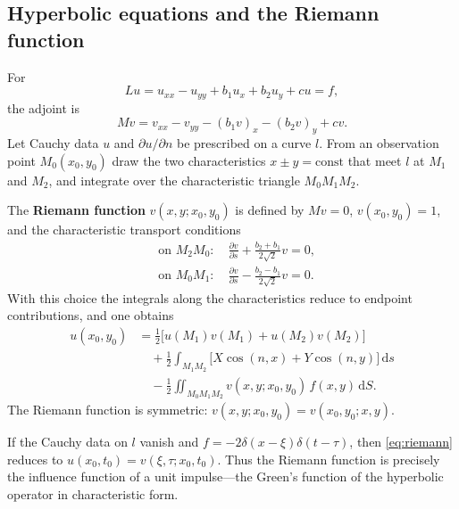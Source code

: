 \subsection{Hyperbolic equations and the Riemann function}

For
\begin{equation}
Lu=u_{xx}-u_{yy}+b_1 u_x+b_2 u_y+cu=f,
\end{equation}
the adjoint is
\begin{equation}
Mv=v_{xx}-v_{yy}-(b_1 v)_x-(b_2 v)_y+cv.
\end{equation}
Let Cauchy data $u$ and $\partial u/\partial n$ be prescribed on a curve $l$. From an observation point $M_0(x_0,y_0)$ draw the two characteristics $x\pm y=\mathrm{const}$ that meet $l$ at $M_1$ and $M_2$, and integrate over the characteristic triangle $M_0M_1M_2$.

The \textbf{Riemann function} $v(x,y;x_0,y_0)$ is defined by $Mv=0$, $v(x_0,y_0)=1$, and the characteristic transport conditions
\begin{equation}
\begin{aligned}
&\text{on }M_2M_0:\quad
\frac{\partial v}{\partial s}+\frac{b_2+b_1}{2\sqrt{2}}v=0,\\
&\text{on }M_0M_1:\quad
\frac{\partial v}{\partial s}-\frac{b_2-b_1}{2\sqrt{2}}v=0.
\end{aligned}
\end{equation}
With this choice the integrals along the characteristics reduce to endpoint contributions, and one obtains
\begin{equation}
\label{eq:riemann}
\begin{aligned}
u(x_0,y_0)
&=\frac12\bigl[u(M_1)v(M_1)+u(M_2)v(M_2)\bigr]\\
&\quad+\frac12\int_{M_1M_2}\bigl[X\cos(n,x)+Y\cos(n,y)\bigr]\,\mathrm{d}s\\
&\quad-\frac12\iint_{M_0M_1M_2}v(x,y;x_0,y_0)\,f(x,y)\,\mathrm{d}S.
\end{aligned}
\end{equation}
The Riemann function is symmetric: $v(x,y;x_0,y_0)=v(x_0,y_0;x,y)$.

\begin{definition}
If the Cauchy data on $l$ vanish and $f=-2\delta(x-\xi)\delta(t-\tau)$, then \eqref{eq:riemann} reduces to $u(x_0,t_0)=v(\xi,\tau;x_0,t_0)$. Thus the Riemann function is precisely the influence function of a unit impulse---the Green's function of the hyperbolic operator in characteristic form.
\end{definition}
